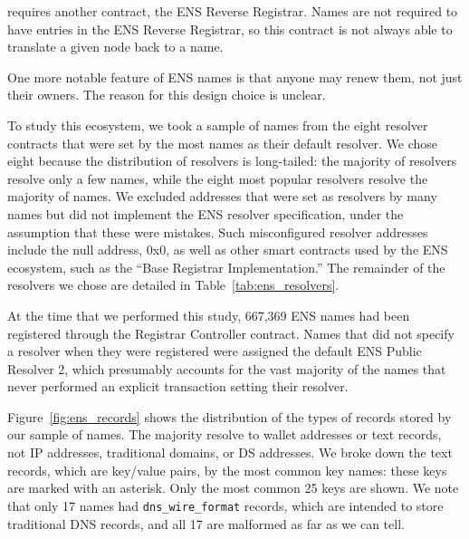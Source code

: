 requires another contract, the ENS Reverse 
Registrar. Names are not required to have entries in the ENS Reverse Registrar, 
so this contract is not always able to translate a given node 
back to a name. 

One more notable feature of ENS names is that anyone may renew 
them, not just their owners. The reason for this design choice 
is unclear.

To study this ecosystem, we took a sample of names from the eight resolver 
contracts that were set by the most names as their default resolver. We chose 
eight because the distribution of resolvers is long-tailed: the majority of 
resolvers resolve only a few names, while the eight most popular resolvers 
resolve the majority of names. We excluded addresses that were set as resolvers 
by many names but did not implement the ENS resolver specification, under the 
assumption that these were mistakes. Such misconfigured resolver addresses 
include the null address, 
0x0, as well as other smart contracts used by the ENS ecosystem, such as the 
``Base Registrar Implementation.''  The remainder of the resolvers we chose are 
detailed in Table~\ref{tab:ens_resolvers}.

At the time that we performed this study, 667,369 ENS names had been 
registered through the Registrar Controller contract. Names that did not 
specify a resolver when they were registered 
were assigned the default ENS Public Resolver 2, which presumably accounts for 
the vast majority of the names that never performed an explicit transaction 
setting their resolver.  

Figure~\ref{fig:ens_records} shows the distribution of the types of records 
stored by our sample of names. The majority resolve to wallet addresses or text 
records, not IP addresses, traditional domains, or DS addresses. We broke down 
the text records, which are key/value pairs, by the most common key names: 
these keys are marked with an asterisk. Only the most common 25 keys are shown. 
We note that only 17 names had \texttt{dns\_wire\_format} records, which are 
intended to store traditional DNS 
records, and all 17 are malformed as far as we can tell. 

%

